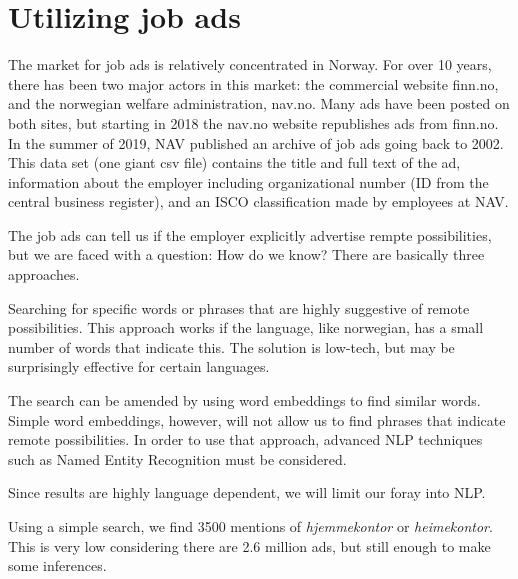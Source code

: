 \documentclass[11pt,]{article}
\newenvironment{Shaded}{\begin{snugshade}}{\end{snugshade}}
\newcommand{\CommentTok}[1]{\textcolor[rgb]{0.56,0.35,0.01}{\textit{#1}}}
\newcommand{\KeywordTok}[1]{\textcolor[rgb]{0.13,0.29,0.53}{\textbf{#1}}}
\newcommand{\NormalTok}[1]{#1}
\newcommand{\OperatorTok}[1]{\textcolor[rgb]{0.81,0.36,0.00}{\textbf{#1}}}
\newcommand{\StringTok}[1]{\textcolor[rgb]{0.31,0.60,0.02}{#1}}
\begin{document}
\hypertarget{utilizing-job-ads}{%
\section{Utilizing job ads}\label{utilizing-job-ads}}

The market for job ads is relatively concentrated in Norway. For over 10
years, there has been two major actors in this market: the commercial
website finn.no, and the norwegian welfare administration, nav.no. Many
ads have been posted on both sites, but starting in 2018 the nav.no
website republishes ads from finn.no. In the summer of 2019, NAV
published an archive of job ads going back to 2002. This data set (one
giant csv file) contains the title and full text of the ad, information
about the employer including organizational number (ID from the central
business register), and an ISCO classification made by employees at NAV.

The job ads can tell us if the employer explicitly advertise rempte
possibilities, but we are faced with a question: How do we know? There
are basically three approaches.

Searching for specific words or phrases that are highly suggestive of
remote possibilities. This approach works if the language, like
norwegian, has a small number of words that indicate this. The solution
is low-tech, but may be surprisingly effective for certain languages.

The search can be amended by using word embeddings to find similar
words. Simple word embeddings, however, will not allow us to find
phrases that indicate remote possibilities. In order to use that
approach, advanced NLP techniques such as Named Entity Recognition must
be considered.

Since results are highly language dependent, we will limit our foray
into NLP.

Using a simple search, we find 3500 mentions of \emph{hjemmekontor} or
\emph{heimekontor}. This is very low considering there are 2.6 million
ads, but still enough to make some inferences.

\begin{Shaded}
\end{Shaded}
\end{document}
